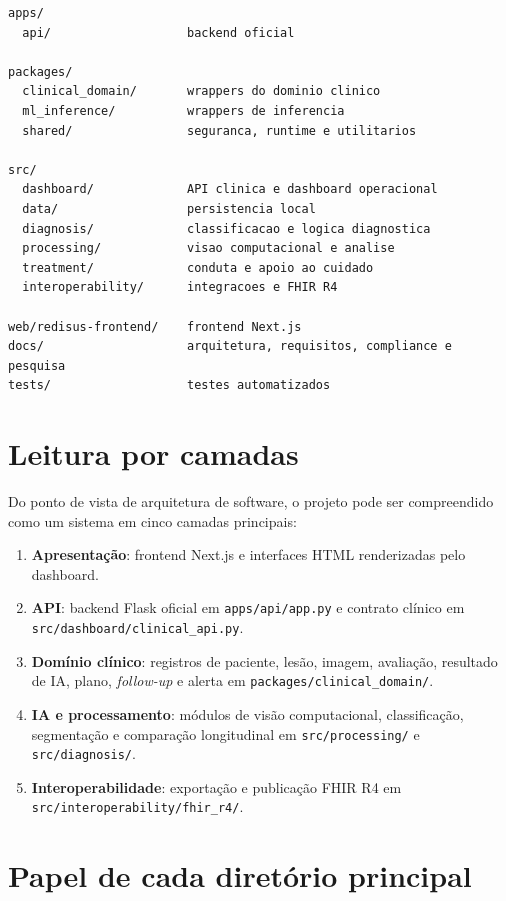 \documentclass[
    12pt,
    openright,
    oneside,
    a4paper,
    chapter=TITLE,
    section=TITLE,
    brazil,
    sumario=tradicional,
    hidelinks
]{abntex2}
\begin{document}
\begin{lstlisting}
apps/
  api/                   backend oficial

packages/
  clinical_domain/       wrappers do dominio clinico
  ml_inference/          wrappers de inferencia
  shared/                seguranca, runtime e utilitarios

src/
  dashboard/             API clinica e dashboard operacional
  data/                  persistencia local
  diagnosis/             classificacao e logica diagnostica
  processing/            visao computacional e analise
  treatment/             conduta e apoio ao cuidado
  interoperability/      integracoes e FHIR R4

web/redisus-frontend/    frontend Next.js
docs/                    arquitetura, requisitos, compliance e pesquisa
tests/                   testes automatizados
\end{lstlisting}

\section{Leitura por camadas}

Do ponto de vista de arquitetura de software, o projeto pode ser compreendido como um sistema em cinco camadas principais:

\begin{enumerate}
    \item \textbf{Apresenta\c{c}\~ao}: frontend Next.js e interfaces HTML renderizadas pelo dashboard.
    \item \textbf{API}: backend Flask oficial em \texttt{apps/api/app.py} e contrato cl\'inico em \texttt{src/dashboard/clinical\_api.py}.
    \item \textbf{Dom\'inio cl\'inico}: registros de paciente, les\~ao, imagem, avalia\c{c}\~ao, resultado de IA, plano, \textit{follow-up} e alerta em \texttt{packages/clinical\_domain/}.
    \item \textbf{IA e processamento}: m\'odulos de vis\~ao computacional, classifica\c{c}\~ao, segmenta\c{c}\~ao e compara\c{c}\~ao longitudinal em \texttt{src/processing/} e \texttt{src/diagnosis/}.
    \item \textbf{Interoperabilidade}: exporta\c{c}\~ao e publica\c{c}\~ao FHIR R4 em \texttt{src/interoperability/fhir\_r4/}.
\end{enumerate}

\section{Papel de cada diret\'orio principal}
\end{document}
